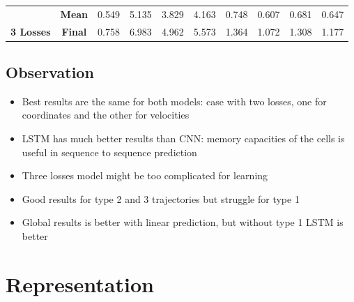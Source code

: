 \documentclass[a0,portrait]{a0poster}
\begin{document}
\begin{multicols}{2}
\begin{center}
\begin{tabular}{cc|c|c|c|c|c|c|c|c|}
\multicolumn{1}{|c|}{}                                   & \textbf{Mean}  &0.549                 &5.135                 &3.829                 &4.163                & 0.748           & 0.607           & 0.681           & 0.647                                  \\ \cline{2-10} 
\multicolumn{1}{|c|}{\multirow{-2}{*}{\textbf{3 Losses}}} & \textbf{Final} &0.758                 &6.983                 &4.962                 &5.573                & 1.364           & 1.072            & 1.308           & 1.177                                  \\ \hline
\end{tabular}
\end{center}
\subsection*{Observation}
\begin{itemize}
\justifying
\item Best results are the same for both models: case with two losses, one for coordinates and the other for velocities
\item LSTM has much better results than CNN: memory capacities of the cells is useful in sequence to sequence prediction
\item Three losses model might be too complicated for learning
\item Good results for type 2 and 3 trajectories but struggle for type 1
\item Global results is better with linear prediction, but without type 1 LSTM is better
\end{itemize}

\section*{Representation}


\end{multicols}
\end{document}
